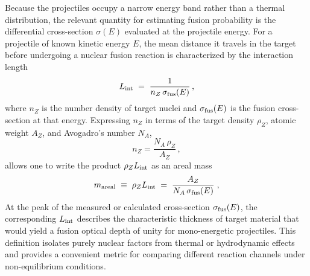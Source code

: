 \documentclass[particles,article,accept,pdftex,moreauthors]{Definitions/mdpi}
\begin{document}
Because the projectiles occupy a narrow energy band rather than a thermal distribution, the relevant quantity for estimating fusion probability is the differential cross-section $\sigma(E)$ evaluated at the projectile energy. For a projectile of known kinetic energy $E$, the mean distance it travels in the target before undergoing a nuclear fusion reaction is characterized by the interaction length
\begin{equation}
 L_{\rm int}
 \;=\;
 \frac{1}{n_{Z}\,\sigma_{\rm fus}(E)} \, ,
 \label{eq:Lint}
\end{equation}
where $n_{Z}$ is the number density of target nuclei and $\sigma_{\rm fus}(E)$ is the fusion cross-section at that energy. Expressing $n_Z$ in terms of the target density $\rho_Z$, atomic weight $A_Z$, and Avogadro's number $N_A$,
\begin{equation}
n_{Z} = \frac{N_A\,\rho_Z}{A_Z}\,,
\end{equation}
allows one to write the product $\rho_Z L_{\rm int}$ as an areal mass
\begin{equation}
 m_{\rm areal}
 \;\equiv\;
 \rho_Z L_{\rm int}
 \;=\;
 \frac{A_Z}{N_A\,\sigma_{\rm fus}(E)} 
 \;,
 \label{eq:m_areal}
\end{equation}
At the peak of the measured or calculated cross-section $\sigma_{\rm fus}(E)$, the corresponding $L_{\rm int}$ describes the characteristic thickness of target material that would yield a fusion optical depth of unity for mono-energetic projectiles. This definition isolates purely nuclear factors from thermal or hydrodynamic effects and provides a convenient metric for comparing different reaction channels under non-equilibrium conditions.
\end{document}
